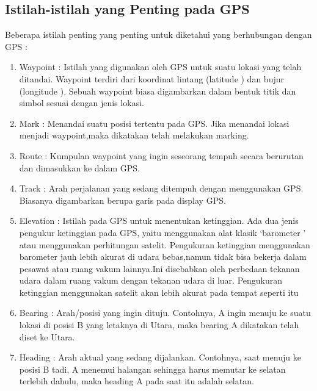 \subsection{Istilah-istilah yang Penting pada GPS}
Beberapa istilah penting yang penting untuk diketahui yang berhubungan dengan GPS :
\begin{enumerate}
	\item Waypoint : Istilah yang digunakan oleh GPS untuk suatu lokasi yang telah ditandai. Waypoint terdiri dari koordinat lintang (latitude ) dan bujur (longitude ). Sebuah waypoint biasa digambarkan dalam bentuk titik dan simbol sesuai dengan jenis lokasi. 
	\item Mark : Menandai suatu posisi tertentu pada GPS. Jika menandai lokasi menjadi waypoint,maka dikatakan telah melakukan marking. 
	\item Route : Kumpulan waypoint yang ingin seseorang tempuh secara berurutan dan dimasukkan ke dalam GPS.
	\item Track :  Arah perjalanan yang sedang ditempuh dengan menggunakan GPS. Biasanya digambarkan berupa garis pada display GPS.
	\item Elevation : Istilah pada GPS untuk menentukan ketinggian. Ada dua jenis pengukur ketinggian pada GPS, yaitu menggunakan alat klasik ‘barometer ’ atau menggunakan perhitungan satelit. Pengukuran ketinggian menggunakan barometer jauh lebih akurat di udara bebas,namun tidak bisa bekerja dalam pesawat atau ruang vakum lainnya.Ini disebabkan oleh perbedaan tekanan udara dalam ruang vakum dengan tekanan udara di luar. Pengukuran ketinggian menggunakan satelit akan lebih akurat pada tempat seperti itu
	\item Bearing : Arah/posisi yang ingin dituju. Contohnya, A ingin menuju ke suatu lokasi di posisi B yang letaknya di Utara, maka bearing A dikatakan telah diset ke Utara.
	\item Heading : Arah aktual yang sedang dijalankan. Contohnya, saat menuju ke posisi B tadi, A menemui halangan sehingga harus memutar ke selatan terlebih dahulu, maka heading A pada saat itu adalah selatan.
\end{enumerate}

